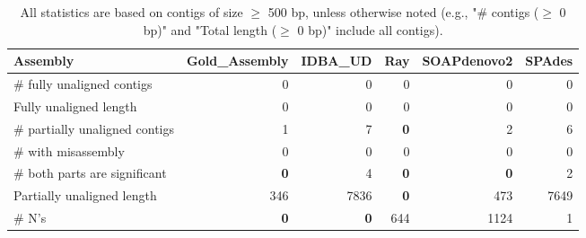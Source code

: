 \documentclass[12pt,a4paper]{article}
\begin{document}
\begin{table}[ht]
\begin{center}
\caption{All statistics are based on contigs of size $\geq$ 500 bp, unless otherwise noted (e.g., "\# contigs ($\geq$ 0 bp)" and "Total length ($\geq$ 0 bp)" include all contigs).}
\begin{tabular}{|l*{5}{|r}|}
\hline
Assembly & Gold\_Assembly & IDBA\_UD & Ray & SOAPdenovo2 & SPAdes \\ \hline
\# fully unaligned contigs & 0 & 0 & 0 & 0 & 0 \\ \hline
Fully unaligned length & 0 & 0 & 0 & 0 & 0 \\ \hline
\# partially unaligned contigs & 1 & 7 & {\bf 0} & 2 & 6 \\ \hline
\hspace{5mm}\# with misassembly & 0 & 0 & 0 & 0 & 0 \\ \hline
\hspace{5mm}\# both parts are significant & {\bf 0} & 4 & {\bf 0} & {\bf 0} & 2 \\ \hline
Partially unaligned length & 346 & 7836 & {\bf 0} & 473 & 7649 \\ \hline
\# N's & {\bf 0} & {\bf 0} & 644 & 1124 & 1 \\ \hline
\end{tabular}
\end{center}
\end{table}
\end{document}
